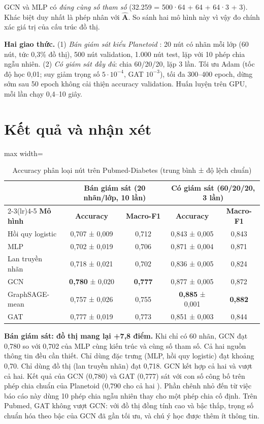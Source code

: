 GCN và MLP có \emph{đúng cùng số tham số} (32.259 = 500·64 + 64 + 64·3 + 3). Khác biệt duy nhất là phép nhân với $\hat{\mathbf A}$. So sánh hai mô hình này vì vậy đo chính xác giá trị của cấu trúc đồ thị.

\textbf{Hai giao thức.} (1) \emph{Bán giám sát kiểu Planetoid} \cite{yang2016planetoid}: 20 nút có nhãn mỗi lớp (60 nút, tức 0,3\% đồ thị), 500 nút validation, 1.000 nút test, lặp với 10 phép chia ngẫu nhiên. (2) \emph{Có giám sát đầy đủ}: chia 60/20/20, lặp 3 lần. Tối ưu Adam (tốc độ học 0,01; suy giảm trọng số $5\cdot10^{-4}$, GAT $10^{-3}$), tối đa 300–400 epoch, dừng sớm sau 50 epoch không cải thiện accuracy validation. Huấn luyện trên GPU, mỗi lần chạy 0,4–10 giây.

\section{Kết quả và nhận xét}

\begin{table}[H]
\centering
\caption{Accuracy phân loại nút trên Pubmed-Diabetes (trung bình ± độ lệch chuẩn)}
\label{tab:ch6-results}
\small
\begin{adjustbox}{max width=\linewidth}
\begin{tabular}{@{}lcccc@{}}
\toprule
 & \multicolumn{2}{c}{\textbf{Bán giám sát (20 nhãn/lớp, 10 lần)}} & \multicolumn{2}{c}{\textbf{Có giám sát (60/20/20, 3 lần)}} \\
\cmidrule(lr){2-3}\cmidrule(lr){4-5}
\textbf{Mô hình} & \textbf{Accuracy} & \textbf{Macro-F1} & \textbf{Accuracy} & \textbf{Macro-F1} \\
\midrule
Hồi quy logistic & 0,707 ± 0,009 & 0,712 & 0,843 ± 0,005 & 0,843 \\
MLP & 0,702 ± 0,019 & 0,706 & 0,871 ± 0,004 & 0,871 \\
Lan truyền nhãn & 0,718 ± 0,021 & 0,702 & 0,836 ± 0,005 & 0,824 \\
GCN & \textbf{0,780} ± 0,020 & \textbf{0,777} & 0,877 ± 0,005 & 0,872 \\
GraphSAGE-mean & 0,757 ± 0,026 & 0,755 & \textbf{0,885} ± 0,001 & \textbf{0,882} \\
GAT & 0,777 ± 0,019 & 0,773 & 0,851 ± 0,003 & 0,844 \\
\bottomrule
\end{tabular}
\end{adjustbox}
\end{table}

\textbf{Bán giám sát: đồ thị mang lại +7,8 điểm.} Khi chỉ có 60 nhãn, GCN đạt 0,780 so với 0,702 của MLP cùng kiến trúc và cùng số tham số. Cả hai nguồn thông tin đều cần thiết. Chỉ dùng đặc trưng (MLP, hồi quy logistic) đạt khoảng 0,70. Chỉ dùng đồ thị (lan truyền nhãn) đạt 0,718. GCN kết hợp cả hai và vượt cả hai. Kết quả của GCN (0,780) và GAT (0,777) sát với con số công bố trên phép chia chuẩn của Planetoid (0,790 cho cả hai \cite{kipf2017,velickovic2018}). Phần chênh nhỏ đến từ việc báo cáo này dùng 10 phép chia ngẫu nhiên thay cho một phép chia cố định. Trên Pubmed, GAT không vượt GCN: với đồ thị đồng tính cao và bậc thấp, trọng số chuẩn hóa theo bậc của GCN đã gần tối ưu, và chú ý học được thêm ít thông tin.

